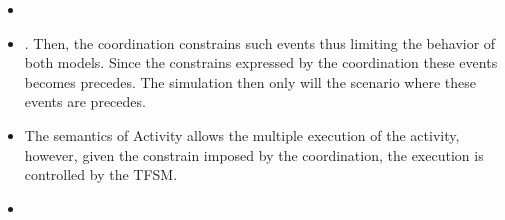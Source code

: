 \begin{itemize}
	\item {}
	\item . Then, the coordination constrains such events thus limiting the behavior of both models. Since the constrains expressed by the coordination these events becomes precedes. The simulation then only will the scenario where these events are precedes. 
	
	\item The semantics of Activity allows the multiple execution of the activity, however, given the constrain imposed by the coordination, the execution is controlled by the TFSM. 
	
	\item {}
	
\end{itemize}